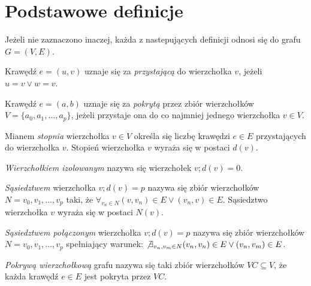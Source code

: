 \section{Podstawowe definicje}\label{Section_Definicje}

Jeżeli nie zaznaczono inaczej, każda z nastepujących definicji odnosi się do
grafu $G=(V,E)$.

\begin{definition}
  Krawędź $e=(u,v)$ uznaje się za \emph{przystającą} do wierzchołka $v$,
  jeżeli $u=v \lor w=v$.
\end{definition}

\begin{definition}
  Krawędź $e=(a,b)$ uznaje się za \emph{pokrytą} przez zbiór wierzchołków \\
  $V=\{a_0, a_1, \ldots, a_p\}$, jeżeli przystaje ona do co najmniej jednego
  wierzchołka $v \in V$.
\end{definition}

\begin{definition}
  Mianem \emph{stopnia} wierzchołka $v \in V$ określa się 
  liczbę krawędzi $e \in E$ przystających do wierzchołka $v$.
  Stopień wierzchołka $v$ wyraża się w postaci $d(v)$.
\end{definition}

\begin{definition}
  \emph{Wierzchołkiem izolowanym} nazywa się wierzchołek $v; d(v)=0$.
\end{definition}

\begin{definition}
  \emph{Sąsiedztwem} wierzchołka $v; d(v)=p$ nazywa się zbiór 
  wierzchołków $N={v_0, v_1, \ldots, v_p}$ taki, że 
  $\forall_{v_n \in N}{(v,v_n) \in E \lor (v_n,v) \in E}$.
  Sąsiedztwo wierzchołka $v$ wyraża się w postaci $N(v)$.
\end{definition}

\begin{definition}
  \emph{Sąsiedztwem połączonym} wierzchołka $v; d(v)=p$ nazywa się zbiór wierzchołków 
  $N={v_0, v_1, \ldots, v_p}$ spełniający warunek:
  $\not \exists_{v_n, v_m \in N}{(v_n,v_n) \in E \lor (v_n,v_m) \in E}$.
\end{definition}

\begin{definition}
  \emph{Pokrywą wierzchołkową} grafu nazywa się taki zbiór wierzchołków
  $VC \subseteq V$, że każda krawędź $e \in E$ jest pokryta przez $VC$.
\end{definition}

